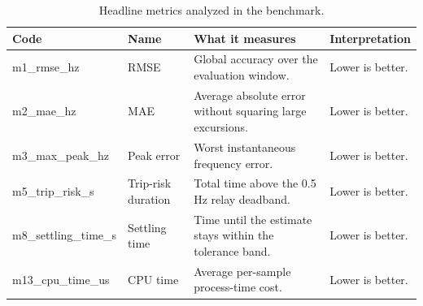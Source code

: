 \begin{table}[t]
\centering
\caption{Headline metrics analyzed in the benchmark.}
\label{tab:metric_catalog}
\scriptsize
\setlength{\tabcolsep}{4pt}
\renewcommand{\arraystretch}{1.12}
\begin{tabular}{l l L{5.1cm} L{3.2cm}}
\toprule
Code & Name & What it measures & Interpretation \\
\midrule
m1\_rmse\_hz & RMSE & Global accuracy over the evaluation window. & Lower is better. \\
m2\_mae\_hz & MAE & Average absolute error without squaring large excursions. & Lower is better. \\
m3\_max\_peak\_hz & Peak error & Worst instantaneous frequency error. & Lower is better. \\
m5\_trip\_risk\_s & Trip-risk duration & Total time above the 0.5 Hz relay deadband. & Lower is better. \\
m8\_settling\_time\_s & Settling time & Time until the estimate stays within the tolerance band. & Lower is better. \\
m13\_cpu\_time\_us & CPU time & Average per-sample process-time cost. & Lower is better. \\
\bottomrule
\end{tabular}
\end{table}

